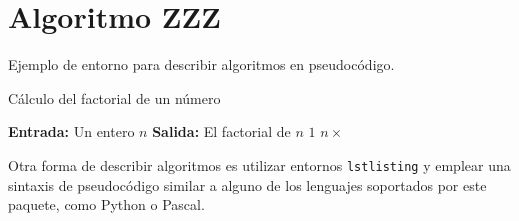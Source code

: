 \section{Algoritmo ZZZ}
\label{Apendice1:ZZZ}

\noindent Ejemplo de entorno para describir algoritmos en pseudocódigo.

\begin{algorithm}
    \caption{Cálculo del factorial de un número}\label{alg:factorial}
    \begin{algorithmic}[1]
        \State \textbf{Entrada:} Un entero $n$
        \State \textbf{Salida:} El factorial de $n$
                \State \Return $1$
            \Else
                \State \Return $n \times$ 
            \EndIf
        \EndFunction
    \end{algorithmic}
\end{algorithm}

Otra forma de describir algoritmos es utilizar entornos \texttt{lstlisting} y emplear una sintaxis de pseudocódigo similar a alguno de los lenguajes soportados por este paquete, como Python o Pascal.